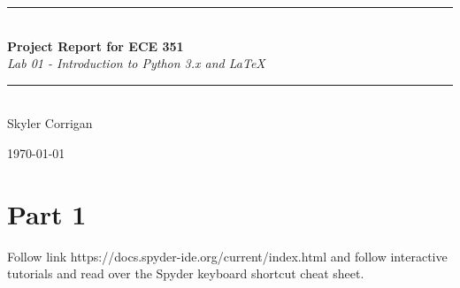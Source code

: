 \documentclass[12pt,a4paper]{article}
\newcommand{\HRule}{\rule{\linewidth}{0.5mm}}
\begin{document}
\begin{titlepage}
\begin{center}



\HRule \\[0.4cm]
{ \LARGE 
  \textbf{Project Report for ECE 351}\\[0.4cm]
  \emph{Lab 01 - Introduction to Python 3.x and LaTeX}\\[0.4cm]
}
\HRule \\[1.5cm]



{ \large
  Skyler Corrigan \\[0.1cm]
}

\vfill



{\large \today}
 
\end{center}
\end{titlepage}


\newpage



\tableofcontents
{}
\newpage
\setcounter{page}{1}

\section{Part 1}\label{sec:intro}
Follow link https://docs.spyder-ide.org/current/index.html and follow interactive tutorials and read over the Spyder keyboard shortcut cheat sheet.\\
\end{document}
